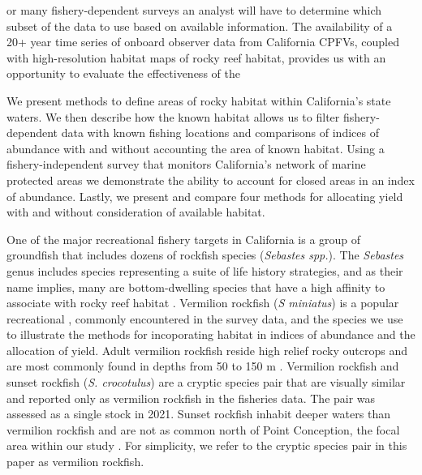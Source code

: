 \documentclass[
  12pt,
  authoryear,
  preprint,
  3p]{elsarticle}
\begin{document}
or many fishery-dependent surveys an analyst will have to determine
which subset of the data to use based on available information. The
availability of a 20+ year time series of onboard observer data from
California CPFVs, coupled with high-resolution habitat maps of rocky
reef habitat, provides us with an opportunity to evaluate the
effectiveness of the

We present methods to define areas of rocky habitat within California's
state waters. We then describe how the known habitat allows us to filter
fishery-dependent data with known fishing locations and comparisons of
indices of abundance with and without accounting the area of known
habitat. Using a fishery-independent survey that monitors California's
network of marine protected areas we demonstrate the ability to account
for closed areas in an index of abundance. Lastly, we present and
compare four methods for allocating yield with and without consideration
of available habitat.

One of the major recreational fishery targets in California is a group
of groundfish that includes dozens of rockfish species (\emph{Sebastes
spp.}). The \emph{Sebastes} genus includes species representing a suite
of life history strategies, and as their name implies, many are
bottom-dwelling species that have a high affinity to associate with
rocky reef habitat \citep{Love:1995:xxx}. Vermilion rockfish (\emph{S
miniatus}) is a popular recreational , commonly encountered in the
survey data, and the species we use to illustrate the methods for
incoporating habitat in indices of abundance and the allocation of
yield. Adult vermilion rockfish reside high relief rocky outcrops and
are most commonly found in depths from 50 to 150 m
\citep{Love:2002:xxx}. Vermilion rockfish and sunset rockfish (\emph{S.
crocotulus}) are a cryptic species pair that are visually similar and
reported only as vermilion rockfish in the fisheries data. The pair was
assessed as a single stock in 2021. Sunset rockfish inhabit deeper
waters than vermilion rockfish and are not as common north of Point
Conception, the focal area within our study \citep{Hyde:2009:xxx}. For
simplicity, we refer to the cryptic species pair in this paper as
vermilion rockfish.
\end{document}
